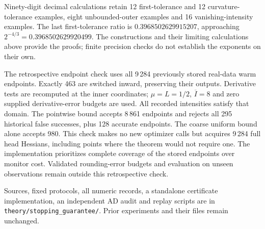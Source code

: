 Ninety-digit decimal calculations retain 12 first-tolerance and 12 curvature-tolerance examples, eight unbounded-outer examples and 16 vanishing-intensity examples. The last first-tolerance ratio is $0.3968502629915207$, approaching $2^{-4/3}=0.3968502629920499$. The constructions and their limiting calculations above provide the proofs; finite precision checks do not establish the exponents on their own.

The retrospective endpoint check uses all 9\,284 previously stored real-data warm endpoints. Exactly 463 are switched inward, preserving their outputs. Derivative tests are recomputed at the inner coordinates; $\mu=L=1/2$, $\overline I=8$ and zero supplied derivative-error budgets are used. All recorded intensities satisfy that domain. The pointwise bound accepts 8\,861 endpoints and rejects all 295 historical false successes, plus 128 accurate endpoints. The coarse uniform bound alone accepts 980. This check makes no new optimizer calls but acquires 9\,284 full head Hessians, including points where the theorem would not require one. The implementation prioritizes complete coverage of the stored endpoints over monitor cost. Validated rounding-error budgets and evaluation on unseen observations remain outside this retrospective check.

Sources, fixed protocols, all numeric records, a standalone certificate implementation, an independent AD audit and replay scripts are in \nolinkurl{theory/stopping_guarantee/}. Prior experiments and their files remain unchanged.
